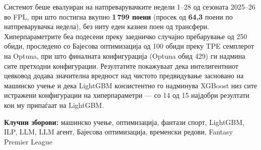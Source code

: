 Системот беше евалуиран на натпреварувачките недели 1--28 од сезоната 2025--26 во FPL, при што постигна вкупно \textbf{1\,799 поени} (просек од \textbf{64,3} поени по натпреварувачка недела), без ниту еден казнен поен од трансфери. Хиперпараметрите беа подесени преку заедничко случајно пребарување од 250 обиди, проследено со Бајесова оптимизација од 100 обиди преку TPE семплерот на Optuna, при што финалната конфигурација (Optuna обид 429) ги надмина сите претходни конфигурации. Резултатите покажуваат дека интелигентниот цевковод додава значителна вредност над чистото предвидување засновано на машинско учење и дека LightGBM конзистентно го надминува XGBoost низ сите истражени конфигурации на хиперпараметри — со 14 од 15 најдобри резултати кои му припаѓаат на LightGBM.

\bigskip
\noindent\textbf{Клучни зборови:} машинско учење, оптимизација, фантази спорт, LightGBM, ILP, LLM, LLM агент, Бајесова оптимизација, временски редови, Fantasy Premier League

